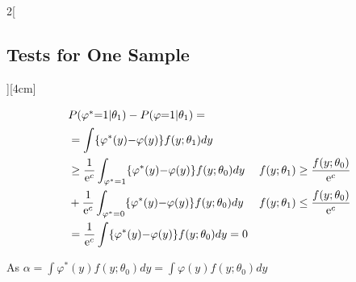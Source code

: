 \documentclass[8pt]{extarticle}
\begin{document}
\begin{multicols}{2}[\subsection{Tests for One Sample}][4cm]
\begin{Proof}
\begin{align*}
\intertext{$P(\varphi^* {=} 1|\theta_1) - P(\varphi {=} 1|\theta_1) = $}
&= \int \{\varphi^*(y) {-} \varphi(y)\} f(y;\theta_1)dy\\
&\geq \frac{1}{\mathrm{e}^c} \int_{\varphi^*{=}1} \{\varphi^*(y) {-} \varphi(y)\}f(y;\theta_0)dy & f(y;\theta_1) \geq \frac{f(y;\theta_0)}{\mathrm{e}^c} \\
&+ \frac{1}{\mathrm{e}^c} \int_{\varphi^*{=}0} \{\varphi^*(y) {-} \varphi(y)\}f(y;\theta_0)dy & f(y;\theta_1) \leq \frac{f(y;\theta_0)}{\mathrm{e}^c} \\
&= \frac{1}{\mathrm{e}^c} \int \{\varphi^*(y) {-} \varphi(y)\}f(y;\theta_0)dy = 0
\end{align*}

\noindent As $\alpha = \int \varphi^*(y)f(y;\theta_0)dy = \int \varphi(y)f(y;\theta_0)dy$
\end{Proof}


\end{multicols}


\end{document}
